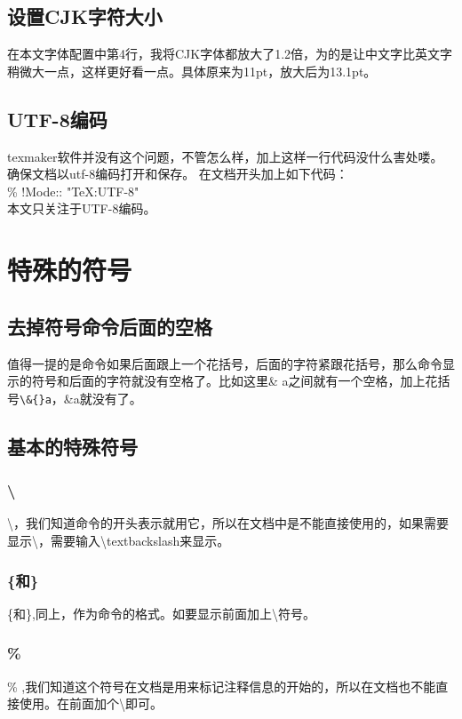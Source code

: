 \documentclass[11pt,oneside]{book}
\begin{document}
\begin{common-format}
\subsection{设置CJK字符大小}
在本文字体配置中第4行，我将CJK字体都放大了1.2倍，为的是让中文字比英文字稍微大一点，这样更好看一点。具体原来为11pt，放大后为13.1pt。



\subsection{UTF-8编码}
texmaker软件并没有这个问题，不管怎么样，加上这样一行代码没什么害处喽。确保文档以utf-8编码打开和保存。
在文档开头加上如下代码：\\
\% !Mode:: "TeX:UTF-8" \\
本文只关注于UTF-8编码。


\section{特殊的符号}
\label{sec:symbols}
\subsection{去掉符号命令后面的空格}
值得一提的是命令如果后面跟上一个花括号，后面的字符紧跟花括号，那么命令显示的符号和后面的字符就没有空格了。比如这里\& a之间就有一个空格，加上花括号\verb+\&{}a+，\&{}a就没有了。

\subsection{基本的特殊符号}
\subsubsection{\textbackslash}
\textbackslash ，我们知道命令的开头表示就用它，所以在文档中是不能直接使用的，如果需要显示\textbackslash ，需要输入\textbackslash textbackslash来显示。

\subsubsection{\{和\}}
\{和\},同上，作为命令的格式。如要显示前面加上\textbackslash 符号。

\subsubsection{\%}
\% ,我们知道这个符号在文档是用来标记注释信息的开始的，所以在文档也不能直接使用。在前面加个\textbackslash 即可。


\end{common-format}
\end{document}
